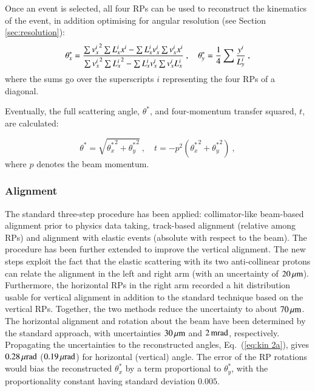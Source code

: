 Once an event is selected, all four RPs can be used to reconstruct the kinematics of the event, in addition optimising for angular resolution (see Section \ref{sec:resolution}):
\begin{equation}
\label{eq:kin 2a}
		\theta_x^* = {
				\sum {v_x^i}^2 \sum L_x^i x^i - \sum L_x^i v_x^i \sum v_x^i x^i
				\over
				\sum {v_x^i}^2 \sum {L_x^i}^2 - \sum L_x^i v_x^i \sum v_x^i L_x^i
			}\ ,\quad
		\theta_y^* = {1\over 4} \sum {y^i\over L_y^i}\ ,
\end{equation}
where the sums go over the superscripts $i$ representing the four RPs of a diagonal.

Eventually, the full scattering angle, $\theta^*$, and four-momentum transfer squared, $t$, are calculated:

\begin{equation}
\label{eq:th t}
\theta^* = \sqrt{{\theta_x^*}^2 + {\theta_y^*}^2}\ ,\quad t = - p^2 ({\theta_x^*}^2 + {\theta_y^*}^2)\ ,
\end{equation}
where $p$ denotes the beam momentum.



\subsubsection{Alignment}
\label{sec:alignment}

The standard three-step procedure \cite{totem-ijmp} has been applied: collimator-like beam-based alignment prior to physics data taking, track-based alignment (relative among RPs) and alignment with elastic events (absolute with respect to the beam). The procedure has been further extended to improve the vertical alignment. The new steps exploit the fact that the elastic scattering with its two anti-collinear protons can relate the alignment in the left and right arm (with an uncertainty of $20\,{\rm \mu m}$). Furthermore, the horizontal RPs in the right arm recorded a hit distribution usable for vertical alignment in addition to the standard technique based on the vertical RPs. Together, the two methods reduce the uncertainty to about $70\,{\rm \mu m}$. The horizontal alignment and rotation about the beam have been determined by the standard approach, with uncertainties $30\,{\rm \mu m}$ and $2\,{\rm m rad}$, respectively. Propagating the uncertainties to the reconstructed angles, Eq.~(\ref{eq:kin 2a}), gives $0.28\,{\rm \mu rad}$ ($0.19\,{\rm \mu rad}$) for horizontal (vertical) angle. The error of the RP rotations would bias the reconstructed $\theta_x^*$ by a term proportional to $\theta_y^*$, with the proportionality constant having standard deviation $0.005$.

